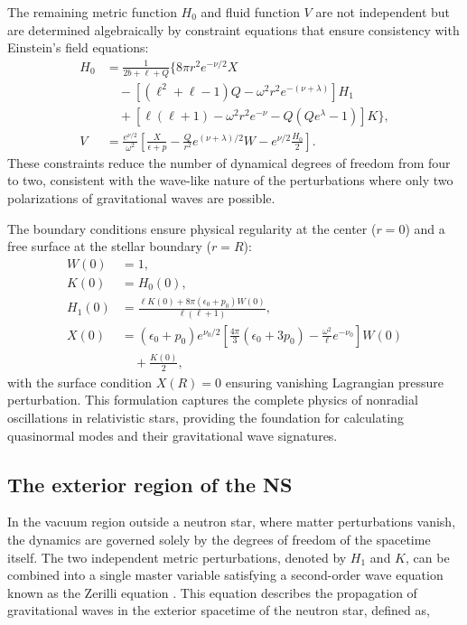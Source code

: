 The remaining metric function \(H_0\) and fluid function \(V\) are not independent but are determined algebraically by constraint equations that ensure consistency with Einstein's field equations\cite{tinaki_ur}:
\begin{equation}
	\begin{aligned}
		H_0 &= \frac{1}{2b + \ell + Q} \Big\{ 8\pi r^2 e^{-\nu/2} X \\
		&\quad - \left[(\ell^2 + \ell - 1) Q - \omega^2 r^2 e^{-(\nu + \lambda)}\right] H_1 \\
		&\quad + \left[\ell(\ell + 1) - \omega^2 r^2 e^{-\nu} - Q(Q e^\lambda - 1)\right] K \Big\}, \\
		V &= \frac{e^{\nu/2}}{\omega^2} \left[ \frac{X}{\epsilon + p} - \frac{Q}{r^2} e^{(\nu + \lambda)/2} W - e^{\nu/2} \frac{H_0}{2} \right].
	\end{aligned}
\end{equation}
These constraints reduce the number of dynamical degrees of freedom from four to two, consistent with the wave-like nature of the perturbations where only two polarizations of gravitational waves are possible.

The boundary conditions ensure physical regularity at the center (\(r = 0\)) and a free surface at the stellar boundary (\(r = R\)):
\begin{equation}
	\begin{aligned}
		W(0) &= 1, \\
		K(0) &= H_0(0), \\
		H_1(0) &= \frac{\ell K(0) + 8\pi (\epsilon_0 + p_0) W(0)}{\ell(\ell + 1)}, \\
		X(0) &= (\epsilon_0 + p_0) e^{\nu_0/2} \left[ \frac{4\pi}{3} (\epsilon_0 + 3p_0) - \frac{\omega^2}{\ell} e^{-\nu_0} \right] W(0) \\
		&\quad + \frac{K(0)}{2},
	\end{aligned}
\end{equation}
with the surface condition \(X(R) = 0\) ensuring vanishing Lagrangian pressure perturbation. This formulation captures the complete physics of nonradial oscillations in relativistic stars, providing the foundation for calculating quasinormal modes and their gravitational wave signatures.


\subsection{The exterior region of the NS}

In the vacuum region outside a neutron star, where matter perturbations vanish, the dynamics are governed solely by the degrees of freedom of the spacetime itself. The two independent metric perturbations, denoted by \( H_1 \) and \( K \), can be combined into a single master variable satisfying a second-order wave equation known as the Zerilli equation \cite{fackerell71,zerilli_1970}. This equation describes the propagation of gravitational waves in the exterior spacetime of the neutron star, defined as,

